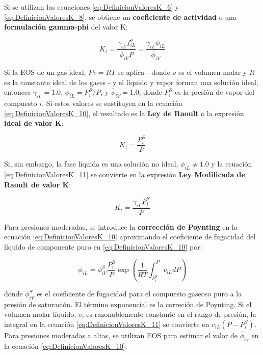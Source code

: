 \documentclass[11pt]{book}
\begin{document}
Si se utilizan las ecuaciones \ref{eq:DefinicionValoresK_6} y \ref{eq:DefinicionValoresK_8}, se obtiene un \textbf{coeficiente de actividad} o una \textbf{formulación gamma-phi} del valor K:

\begin{equation}
    \label{eq:DefinicionValoresK_10}
    K_i = \frac{\gamma_{iL} f_{iL}^o}{\overline{\phi}_{iV} P} = \frac{\gamma_{iL} \phi_{iL}}{\overline{\phi}_{iV}}
\end{equation}

Si la EOS de un gas ideal, $P v = RT$ se aplica - donde $v$ es el volumen molar y $R$ es la constante ideal de los gases - y el líquido y vapor forman una solución ideal, entonces $\gamma_{iL} = 1.0$, $\phi_{iL} = P_i^S/P$, y $\overline{\phi}_{iV} = 1.0$, donde $P_i^S$ es la presión de vapor del compuesto $i$. Si estos valores se sustituyen en la ecuación \ref{eq:DefinicionValoresK_10}, el resultado es la \textbf{Ley de Raoult} o la expresión \textbf{ideal de valor K}:

\begin{equation}
    \label{eq:DefinicionValoresK_11}
    K_i = \frac{P_i^S}{P}
\end{equation}

Si, sin embargo, la fase líquida es una solución no ideal, $\phi_{iL} \neq 1.0$ y la ecuación \ref{eq:DefinicionValoresK_11} se convierte en la expresión \textbf{Ley Modificada de Raoult de valor K}:

\begin{equation}
    \label{eq:DefinicionValoresK_12}
    K_i = \frac{\gamma_{iL} P_i^S}{P}
\end{equation}

Para presiones moderadas, se introduce la \textbf{corrección de Poynting} en la ecuación \ref{eq:DefinicionValoresK_10} aproximando el coeficiente de fugacidad del líquido de componente puro en \ref{eq:DefinicionValoresK_10} por:

\begin{equation}
    \label{eq:DefinicionValoresK_13}
    \phi_{iL} = \phi_{iV}^S \frac{P_i^S}{P} \exp \left( \frac{1}{RT} \int_{P_i^S}^P v_{iL} dP \right)
\end{equation}

donde $\phi_{iV}^S$ es el coeficiente de fugacidad para el compuesto gaseoso puro a la presión de saturación. El término exponencial es la correción de Poynting. Si el volumen molar líquido, $v$, es razonablemente constante en el rango de presión, la integral en la ecuación \ref{eq:DefinicionValoresK_11} se convierte en $v_{iL} (P - P_i^S)$. Para presiones moderadas a altas, se utilizan  EOS para estimar el valor de $\overline{\phi}_{iV}$ en la ecuación \ref{eq:DefinicionValoresK_10}.
\end{document}
